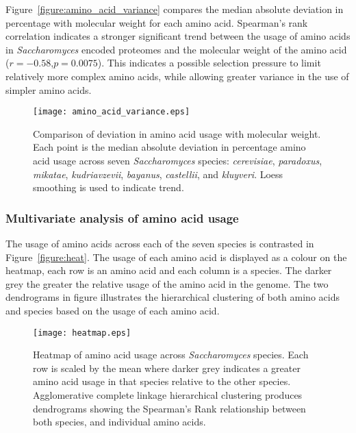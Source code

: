 Figure~\vref{figure:amino_acid_variance} compares the median absolute deviation in percentage with molecular weight for each amino acid. Spearman's rank correlation indicates a stronger significant trend between the usage of amino acids in \emph{Saccharomyces} encoded proteomes and the molecular weight of the amino acid ($r = - 0.58$,$p = 0.0075$). This indicates a possible selection pressure to limit relatively more complex amino acids, while allowing greater variance in the use of simpler amino acids.

\begin{figure}
  \centering
  \texttt{[image: amino\_acid\_variance.eps]}
  \caption[Comparison of deviation in amino acid usage with molecular weight]{Comparison of deviation in amino acid usage with molecular weight. Each point is the median absolute deviation in percentage amino acid usage across seven \emph{Saccharomyces} species: \emph{cerevisiae}, \emph{paradoxus}, \emph{mikatae}, \emph{kudriavzevii}, \emph{bayanus}, \emph{castellii}, and \emph{kluyveri}. Loess smoothing is used to indicate trend.}
  \label{figure:amino_acid_variance}
\end{figure}

\subsubsection{Multivariate analysis of amino acid usage}

The usage of amino acids across each of the seven species is contrasted in Figure~\vref{figure:heat}. The usage of each amino acid is displayed as a colour on the heatmap, each row is an amino acid and each column is a species. The darker grey the greater the relative usage of the amino acid in the genome. The two dendrograms in figure illustrates the hierarchical clustering of both amino acids and species based on the usage of each amino acid.

\begin{figure}
  \centering
  \texttt{[image: heatmap.eps]}
  \caption[Heatmap of amino acid usage across \emph{Saccharomyces} species]{Heatmap of amino acid usage across \emph{Saccharomyces} species. Each row is scaled by the mean where darker grey indicates a greater amino acid usage in that species relative to the other species. Agglomerative complete linkage hierarchical clustering produces dendrograms showing the Spearman's Rank relationship between both species, and individual amino acids.}
  \label{figure:heat}
\end{figure}

